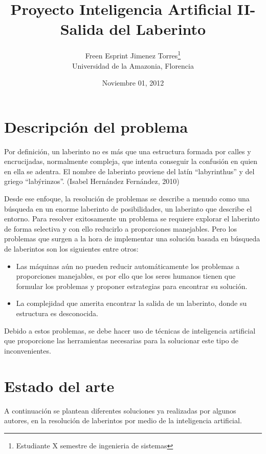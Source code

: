 \documentclass{article}%
\begin{document}
\title{Proyecto Inteligencia Artificial II- Salida del Laberinto }
\author{Freen Esprint Jimenez Torres\thanks{Estudiante X semestre de ingenieria de sistemas}
\\Universidad de la Amazonia, Florencia}
\date{Noviembre 01, 2012}
\maketitle


\section{Descripción del problema}
Por definici\'on, un laberinto no es m\'as que una estructura formada por calles y encrucijadas, normalmente compleja, que intenta conseguir la confusi\'on en quien en ella se adentra. El nombre de laberinto proviene del lat\'in “labyrinthus” y del griego “lab\'yrinzos”. (Isabel Hern\'andez Fern\'andez, 2010)

Desde ese enfoque, la resoluci\'on de problemas se describe a menudo como una b\'usqueda en un enorme laberinto de posibilidades, un laberinto que describe el entorno. Para resolver exitosamente un problema se requiere explorar el laberinto de forma selectiva y con ello reducirlo a proporciones manejables. Pero los problemas que surgen a la hora de implementar una soluci\'on basada en b\'usqueda de laberintos son los siguientes entre otros:

\begin{itemize}
\item Las m\'aquinas a\'un no pueden reducir autom\'aticamente los problemas a proporciones manejables, es por ello que los seres humanos tienen que formular los problemas y proponer estrategias para encontrar su soluci\'on.
\item La complejidad que amerita encontrar la salida de un laberinto, donde su estructura es desconocida.
\end{itemize}

Debido a estos problemas, se debe hacer uso de t\'ecnicas de inteligencia artificial que proporcione las herramientas necesarias para la solucionar este tipo de inconvenientes.

\section{Estado del arte}
A continuaci\'on se plantean diferentes soluciones ya realizadas por algunos autores, en la resoluci\'on de laberintos por medio de la inteligencia artificial.
\end{document}
